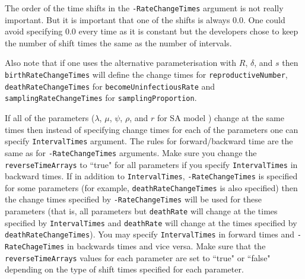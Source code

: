 \documentclass[12pt]{article}
\begin{document}
The order of the time shifts in the {\tt -RateChangeTimes} argument is not really important. But it is important that one of the shifts is always 0.0. One could avoid specifying 0.0 every time as it is constant but the developers chose to keep the number of shift times the same as the number of intervals. 

Also note that if one uses the alternative parameterisation with $R$, $\delta$, and $s$ then {\tt birthRateChangeTimes} will define the change times for {\tt reproductiveNumber}, {\tt deathRateChangeTimes} for {\tt becomeUninfectiousRate} and {\tt samplingRateChangeTimes} for {\tt samplingProportion}. 

If all of the parameters ($\lambda$, $\mu$, $\psi$, $\rho$, and $r$ for SA model \cite{Gavryushkina2014}) change at the same times then instead of specifying change times for each of the parameters one can specify {\tt IntervalTimes} argument. The rules for forward/backward time are the same as for  {\tt -RateChangeTimes} arguments. Make sure you change the {\tt reverseTimeArrays} to ``true" for all parameters if you specify  {\tt IntervalTimes} in backward times.  If in addition to {\tt IntervalTimes}, {\tt -RateChangeTimes} is specified for some parameters (for example, {\tt deathRateChangeTimes} is also specified) then the change times specified by {\tt -RateChangeTimes} will be used for these parameters (that is, all parameters but {\tt deathRate} will change at the times specified by {\tt IntervalTimes} and {\tt deathRate} will change at the times specified by {\tt deathRateChangeTimes}). You may specify {\tt IntervalTimes} in forward times and {\tt -RateChageTimes} in backwards times and vice versa. Make sure that the {\tt reverseTimeArrays} values for each parameter are set to ``true" or ``false" depending on the type of shift times specified for each parameter. 


\end{document}
